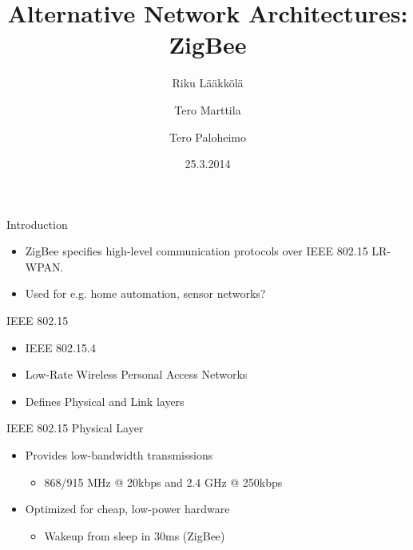 \documentclass{beamer}
\title[ZigBee]{Alternative Network Architectures: ZigBee}
\author{Riku Lääkkölä \and Tero Marttila \and Tero Paloheimo}
\institute{Aalto ELEC}
\date{25.3.2014}
\begin{document}
\begin{frame}
  	\titlepage
\end{frame}


\begin{frame}{Introduction}
  \begin{itemize}
    \item ZigBee specifies high-level communication protocols over IEEE 802.15 LR-WPAN.
    \item Used for e.g. home automation, sensor networks?
  \end{itemize}
\end{frame}

\begin{frame}{IEEE 802.15}
  \begin{itemize}
  	\item IEEE 802.15.4
  	\item Low-Rate Wireless Personal Access Networks
	\item Defines Physical and Link layers
  	
  \end{itemize}
\end{frame}

\begin{frame}{IEEE 802.15 Physical Layer}
  \begin{itemize}
  	\item Provides low-bandwidth transmissions
  	\begin{itemize}
  		\item 868/915 MHz @ 20kbps and 2.4 GHz @ 250kbps
  	\end{itemize}
  	\item Optimized for cheap, low-power hardware
  	\begin{itemize}
    	\item Wakeup from sleep in 30ms (ZigBee)
  	\end{itemize}
  \end{itemize}
\end{frame}
\end{document}
